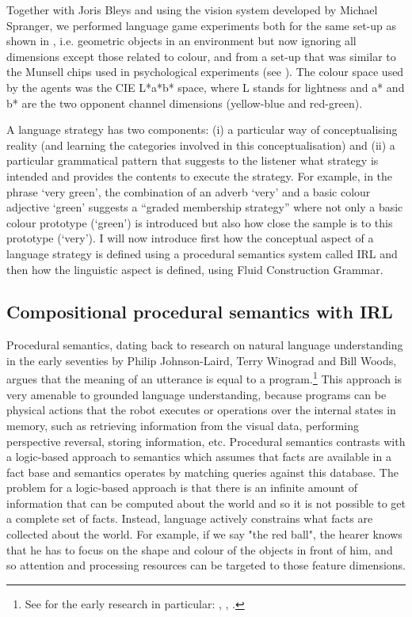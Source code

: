 Together with Joris Bleys and using the vision system developed by Michael Spranger, we 
performed language game experiments both for the same set-up as shown in , 
i.e. geometric objects in an environment but now ignoring all dimensions except those related to colour, 
and from a set-up that was similar to the Munsell chips used
in psychological experiments (see ). The colour space used by the agents was the CIE L*a*b* space, where 
L stands for lightness and a* and b* are the two opponent channel dimensions (yellow-blue and red-green). 

A language strategy has two components: (i) a particular way of conceptualising reality (and learning the categories involved
in this conceptualisation) and (ii) a particular grammatical pattern that suggests to the listener what strategy is intended 
and provides the contents to execute the strategy. For example, in the phrase `very green', the combination of an adverb 
`very' and a basic colour adjective `green' suggests a ``graded membership strategy'' where not only a basic colour prototype
(`green') is introduced but also how close the sample is to this prototype (`very'). I will now introduce first how 
the conceptual aspect of a language strategy is defined using a procedural semantics system called IRL and then how the 
linguistic aspect is defined, using Fluid Construction Grammar. 

\subsection{Compositional procedural semantics with IRL}

Procedural semantics, dating back to research on natural language understanding in the 
early seventies by Philip Johnson-Laird, Terry Winograd and Bill Woods, argues that the meaning of an utterance is 
equal to a program.\footnote{See for the early research in particular: \cite{Winograd:1971}, \cite{Woods:1981}, 
\cite{Johnson-Laird:1977}.} 
This approach is very amenable to grounded language understanding, because programs can be physical 
actions that the robot executes or operations over the internal states in memory, such as retrieving information
from the visual data, performing perspective reversal, storing information, etc. Procedural semantics
contrasts with a logic-based approach to semantics which assumes that facts are available in a fact base and semantics operates
by matching queries against this database. The problem for a logic-based approach
is that there is an infinite amount of
information that can be computed about the world and so it is not possible to get a 
complete set of facts. Instead, language actively constrains what facts are collected about the world. For example, if 
we say "the red ball", the hearer knows that he has to focus on the shape and colour of the objects in front of him, 
and so attention and processing resources can be targeted to those feature dimensions. 

